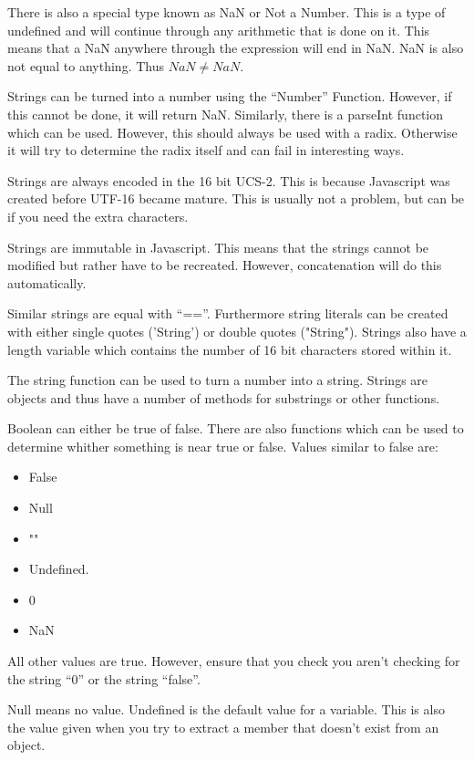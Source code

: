 \documentclass[a4paper,11pt]{report}
\begin{document}
			There is also a special type known as NaN or Not a Number. 
			This is a type of undefined and will continue through any arithmetic that is done on it. 
			This means that a NaN anywhere through the expression will end in NaN. 
			NaN is also not equal to anything. 
			Thus $NaN \ne NaN$. 
			
			Strings can be turned into a number using the ``Number'' Function. 
			However, if this cannot be done, it will return NaN. 
			Similarly, there is a parseInt function which can be used. 
			However, this should always be used with a radix. 
			Otherwise it will try to determine the radix itself and can fail in interesting ways. 

			Strings are always encoded in the 16 bit UCS-2. 
			This is because Javascript was created before UTF-16 became mature. 
			This is usually not a problem, but can be if you need the extra characters. 

			Strings are immutable in Javascript. 
			This means that the strings cannot be modified but rather have to be recreated. 
			However, concatenation will do this automatically. 

			Similar strings are equal with ``==''. 
			Furthermore string literals can be created with either single quotes ('String') or double quotes ("String"). 
			Strings also have a length variable which contains the number of 16 bit characters stored within it. 

			The string function can be used to turn a number into a string. 
			Strings are objects and thus have a number of methods for substrings or other functions. 

			Boolean can either be true of false. 
			There are also functions which can be used to determine whither something is near true or false. 
			Values similar to false are:
			\begin{itemize}
				\item False
				\item Null
				\item ""
				\item Undefined. 
				\item 0
				\item NaN
			\end{itemize}
			All other values are true. 
			However, ensure that you check you aren't checking for the string ``0'' or the string ``false''. 

			Null means no value. 
			Undefined is the default value for a variable. 
			This is also the value given when you try to extract a member that doesn't exist from an object. 
			
\end{document}
